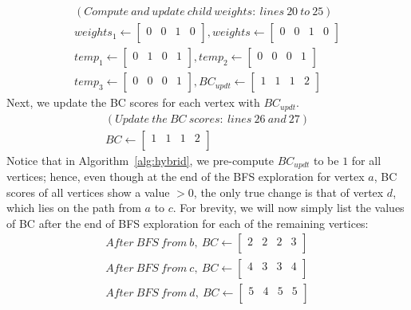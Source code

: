 \begin{align*}
(Compute\ and\ update\ child\ weights:\ lines\ 20\ to\ 25)\\
weights_1\leftarrow{}\left[\begin{array}{cccc}0 & 0 & 1 & 0 \\\end{array} \right],
weights\leftarrow{}\left[\begin{array}{cccc}0 & 0 & 1 & 0 \\\end{array} \right]\\
temp_1\leftarrow{}\left[\begin{array}{cccc}0 & 1 & 0 & 1 \\\end{array} \right],
temp_2\leftarrow{}\left[\begin{array}{cccc}0 & 0 & 0 & 1 \\\end{array} \right]\\
temp_3\leftarrow{}\left[\begin{array}{cccc}0 & 0 & 0 & 1 \\\end{array} \right],
BC_{updt}\leftarrow{}\left[\begin{array}{cccc}1 & 1 & 1 & 2 \\\end{array} \right]
\end{align*}
%
Next, we update the BC scores for each vertex with $BC_{updt}$.
%
\begin{align*}
(Update\ the\ BC\ scores:\ lines\ 26\ and\ 27)\\
BC\leftarrow{}\left[\begin{array}{cccc}1 & 1 & 1 & 2 \\\end{array} \right]
\end{align*}
%
Notice that in Algorithm~\ref{alg:hybrid}, we pre-compute $BC_{updt}$ to be $1$
for all vertices; hence, even though at the end of the BFS exploration for 
vertex $a$, BC scores of all vertices show a value $>0$, the only true change
is that of vertex $d$, which lies on the path from $a$ to $c$.
%
For brevity, we will now simply list the values of BC after the end of BFS 
exploration for each of the remaining vertices:
%
\begin{align*}
After\ BFS\ from\ b,\ 
BC\leftarrow{}\left[\begin{array}{cccc}2 & 2 & 2 & 3 \\\end{array} \right]\\
After\ BFS\ from\ c,\ 
BC\leftarrow{}\left[\begin{array}{cccc}4 & 3 & 3 & 4 \\\end{array} \right]\\
After\ BFS\ from\ d,\ 
BC\leftarrow{}\left[\begin{array}{cccc}5 & 4 & 5 & 5 \\\end{array} \right]
\end{align*}
